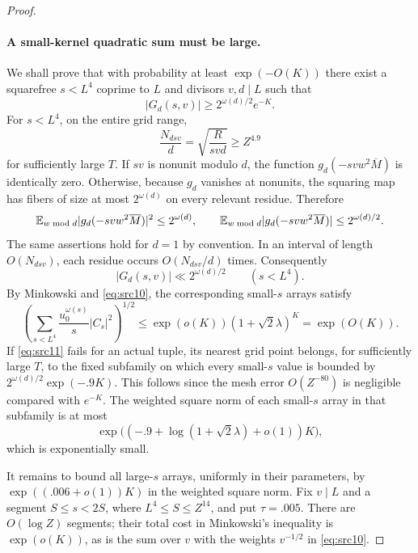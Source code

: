 \begin{proof}
\paragraph{A small-kernel quadratic sum must be large.}
We shall prove that with probability at least $\exp(-O(K))$ there
exist a squarefree $s<L^4$ coprime to $L$ and divisors $v,d\mid L$
such that
\begin{equation}\label{eq:src11}
 |G_d(s,v)|\geq2^{\omega(d)/2}e^{-K}.
\end{equation}
For $s<L^4$, on the entire grid range,
\[
 \frac{N_{dsv}}d=\sqrt{\frac R{svd}}\geq Z^{4.9}
\]
for sufficiently large $T$.
If $sv$ is nonunit modulo $d$, the function
$g_d(-svw^2\overline M)$ is identically zero.  Otherwise, because
$g_d$ vanishes at nonunits, the squaring map has fibers of size at
most $2^{\omega(d)}$ on every relevant residue.  Therefore
\[
 \mathbb E_{w\bmod d}|g_d(-svw^2\overline M)|^2\leq2^{\omega(d)},
 \qquad
 \mathbb E_{w\bmod d}|g_d(-svw^2\overline M)|\leq2^{\omega(d)/2}.
\]
The same assertions hold for $d=1$ by convention.
In an interval of length $O(N_{dsv})$, each residue occurs
$O(N_{dsv}/d)$ times.  Consequently
\begin{equation}\label{eq:quad-small-G-upper}
 |G_d(s,v)|\ll2^{\omega(d)/2}\qquad(s<L^4).
\end{equation}
By Minkowski and \eqref{eq:src10}, the corresponding small-$s$
arrays satisfy
\[
 \left(\sum_{s<L^4}\frac{u_0^{\omega(s)}}s|C_s|^2\right)^{1/2}
 \leq\exp(o(K))(1+\sqrt2\lambda)^K=\exp(O(K)).
\]
If \eqref{eq:src11} fails for an actual tuple, its nearest grid point
belongs, for sufficiently large $T$, to the fixed subfamily on which
every small-$s$ value is bounded by
$2^{\omega(d)/2}\exp(-.9K)$.  This follows since the mesh error
$O(Z^{-80})$ is negligible compared with $e^{-K}$.
The weighted square norm of each small-$s$ array in that subfamily is
at most
\begin{equation}\label{eq:quad-small-off-event}
 \exp\bigl((- .9+\log(1+\sqrt2\lambda)+o(1))K\bigr),
\end{equation}
which is exponentially small.

It remains to bound all large-$s$ arrays, uniformly in their
parameters, by $\exp((.006+o(1))K)$ in the weighted square norm.
Fix $v\mid L$ and a segment $S\leq s<2S$, where
$L^4\leq S\leq Z^{14}$, and put $\tau=.005$.
There are $O(\log Z)$ segments; their total cost in Minkowski's
inequality is $\exp(o(K))$, as is the sum over $v$ with the weights
$v^{-1/2}$ in \eqref{eq:src10}.


\end{proof}
